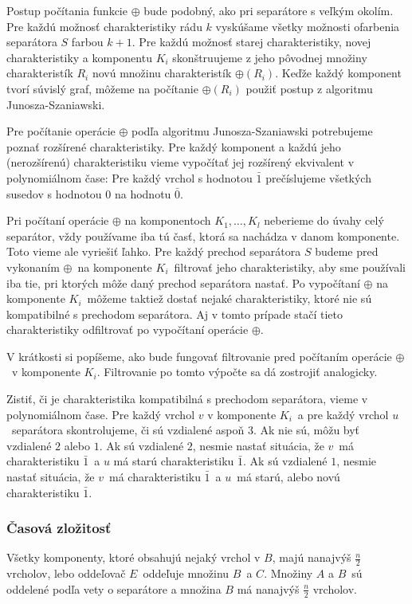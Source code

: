 Postup počítania funkcie $\oplus$ bude podobný, ako pri separátore s veľkým okolím. Pre každú možnosť
charakteristiky rádu $k$ vyskúšame všetky možnosti ofarbenia separátora $S$ farbou $k+1$. Pre každú
možnosť starej charakteristiky, novej charakteristiky a komponentu $K_i$ skonštruujeme z jeho pôvodnej
množiny charakteristík $R_i$ novú množinu charakteristík $\oplus(R_i)$. Keďže každý komponent tvorí súvislý
graf, môžeme na počítanie $\oplus(R_i)$ použiť postup z algoritmu Junosza-Szaniawski.

Pre počítanie operácie $\oplus$ podľa algoritmu Junosza-Szaniawski potrebujeme poznať rozšírené charakteristiky.
Pre každý komponent a každú jeho (nerozšírenú) charakteristiku vieme vypočítať jej rozšírený ekvivalent v
polynomiálnom čase: Pre každý vrchol s hodnotou $\bar{1}$ prečíslujeme všetkých susedov s hodnotou $0$
na hodnotu $\bar{0}$.

Pri počítaní operácie $\oplus$ na komponentoch $K_1, \ldots, K_l$ neberieme do úvahy celý separátor,
vždy používame iba tú časť, ktorá sa nachádza v danom komponente. Toto vieme ale vyriešiť ľahko. Pre
každý prechod separátora $S$ budeme pred vykonaním $\oplus$ na komponente $K_i$ filtrovať jeho
charakteristiky, aby sme používali iba tie, pri ktorých môže daný prechod separátora nastať. Po vypočítaní
$\oplus$ na komponente $K_i$ môžeme taktiež dostať nejaké charakteristiky, ktoré nie sú kompatibilné
s prechodom separátora. Aj v tomto prípade stačí tieto charakteristiky odfiltrovať po vypočítaní
operácie $\oplus$.

V krátkosti si popíšeme, ako bude fungovať filtrovanie pred počítaním operácie $\oplus$ v komponente $K_i$.
Filtrovanie po tomto výpočte sa dá zostrojiť analogicky.

Zistiť, či je charakteristika kompatibilná s prechodom separátora, vieme v polynomiálnom čase. Pre
každý vrchol $v$ v komponente $K_i$ a pre každý vrchol $u$ separátora skontrolujeme, či sú vzdialené
aspoň $3$. Ak nie sú, môžu byť vzdialené $2$ alebo $1$. Ak sú vzdialené $2$, nesmie nastať situácia,
že $v$ má charakteristiku $\bar{1}$ a $u$ má starú charakteristiku $\bar{1}$. Ak sú vzdialené $1$,
nesmie nastať situácia, že $v$ má charakteristiku $\bar{1}$ a $u$ má starú, alebo novú charakteristiku
$\bar{1}$.

\subsubsection{Časová zložitosť}

Všetky komponenty, ktoré obsahujú nejaký vrchol v $B$, majú nanajvýš $\frac{n}{2}$ vrcholov, lebo
oddeľovač $E$ oddeľuje množinu $B$ a $C$. Množiny $A$ a $B$ sú oddelené podľa vety o separátore
a množina $B$ má nanajvýš $\frac{n}{2}$ vrcholov.

